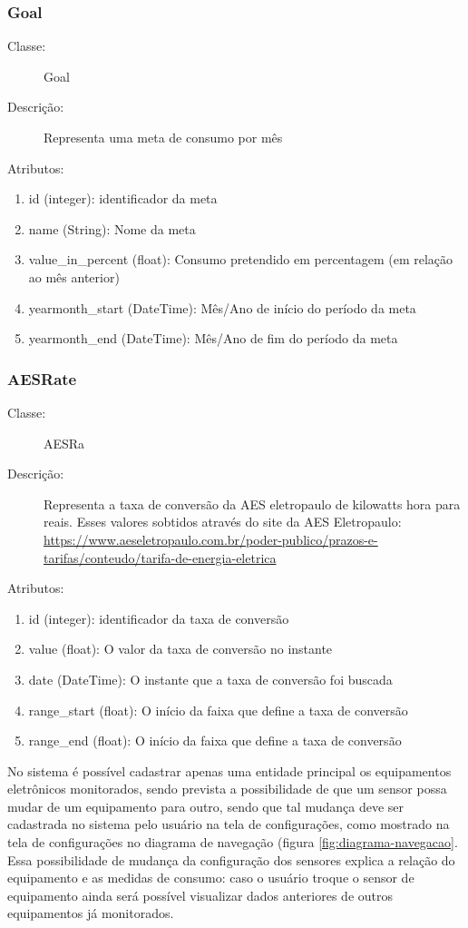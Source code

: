 \subsubsection{Goal}
\begin{description}
	\item[Classe:] Goal
	\item[Descrição:] Representa uma meta de consumo por mês
	\item[Atributos:]
\end{description} 
\begin{enumerate}
	\item id (integer): identificador da meta
	\item name (String):  Nome da meta
	\item value\_in\_percent (float): Consumo pretendido em percentagem (em relação ao mês anterior)
	\item yearmonth\_start (DateTime): Mês/Ano de início do período da meta
    \item yearmonth\_end (DateTime): Mês/Ano de fim do período da meta
\end{enumerate}
%
\subsubsection{AESRate}
\begin{description}
	\item[Classe:] AESRa
	\item[Descrição:] Representa a taxa de conversão da AES eletropaulo de kilowatts hora para reais. Esses valores sobtidos através do site da AES Eletropaulo: \url{https://www.aeseletropaulo.com.br/poder-publico/prazos-e-tarifas/conteudo/tarifa-de-energia-eletrica}
	\item[Atributos:]
\end{description} 
\begin{enumerate}
	\item id (integer): identificador da taxa de conversão
	\item value (float): O valor da taxa de conversão no instante
	\item date (DateTime): O instante que a taxa de conversão foi buscada
	\item range\_start (float): O início da faixa que define a taxa de conversão
    \item range\_end (float): O início da faixa que define a taxa de conversão
\end{enumerate}

No sistema é possível cadastrar apenas uma entidade principal os equipamentos eletrônicos monitorados, sendo prevista a possibilidade de que um sensor possa mudar de um equipamento para outro, sendo que tal mudança deve ser cadastrada no sistema pelo  usuário na tela de configurações, como mostrado na tela de configurações no diagrama de navegação (figura \ref{fig:diagrama-navegacao}.  Essa possibilidade de mudança da configuração dos sensores explica a relação do equipamento e as medidas de consumo: caso o usuário troque o sensor de equipamento ainda será possível visualizar dados anteriores de outros equipamentos já monitorados.

